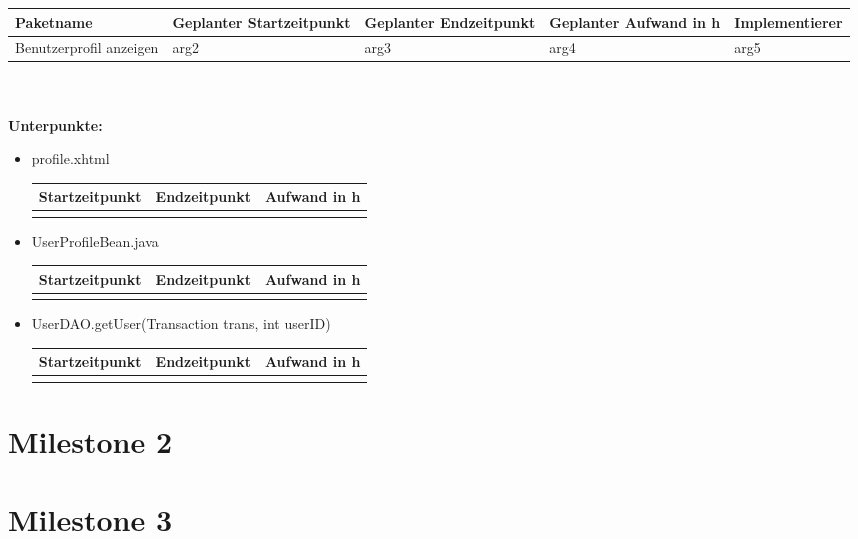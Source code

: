 \documentclass[12pt,a4paper]{scrreprt}
\newcommand{\Arbeitspaket}[5]{	\begin{tabular}{|p{4cm}|p{3cm}|p{3cm}|p{3cm}|p{3cm}|}
		\hline \textbf{Paketname} & \textbf{Geplanter Startzeitpunkt} & \textbf{Geplanter Endzeitpunkt} & \textbf{Geplanter Aufwand in h} & \textbf{Implementierer} \\ 
		\hline #1 & #2  & #3 & #4 & #5 \\ 
		\hline 
	\end{tabular} \ \\
	\ \\}
\begin{document}
	\Arbeitspaket{Benutzerprofil anzeigen}{arg2}{arg3}{arg4}{arg5}
	\textbf{Unterpunkte:}
	\begin{itemize}
		\item profile.xhtml\\
		\begin{tabular}{|p{4cm}|p{4cm}|p{4cm}|}
			\hline Startzeitpunkt & Endzeitpunkt & Aufwand in h \\ 
			\hline &      &  \\ 
			\hline 
		\end{tabular}
		\item UserProfileBean.java\\
		\begin{tabular}{|p{4cm}|p{4cm}|p{4cm}|}
			\hline Startzeitpunkt & Endzeitpunkt & Aufwand in h \\ 
			\hline &      &  \\ 
			\hline 
		\end{tabular}
		\item UserDAO.getUser(Transaction trans, int userID)\\
		\begin{tabular}{|p{4cm}|p{4cm}|p{4cm}|}
			\hline Startzeitpunkt & Endzeitpunkt & Aufwand in h \\ 
			\hline &      &  \\ 
			\hline 
		\end{tabular}
	\end{itemize}

	\chapter*{Milestone 2}
	
	\chapter*{Milestone 3}
	
\end{document}
